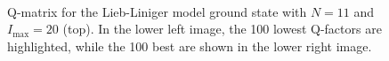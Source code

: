 \documentclass[11pt, a4paper]{report} %
\begin{document}
\begin{figure}[tb!]
  \centering
  \\
  \caption{Q-matrix for the Lieb-Liniger model ground state with \(N=11\) and \(I_{\max}=20\) (top). In the lower left image, the 100 lowest Q-factors are highlighted, while the 100 best are shown in the lower right image.}
  \label{fig:qmatrix}
\end{figure}
\end{document}
